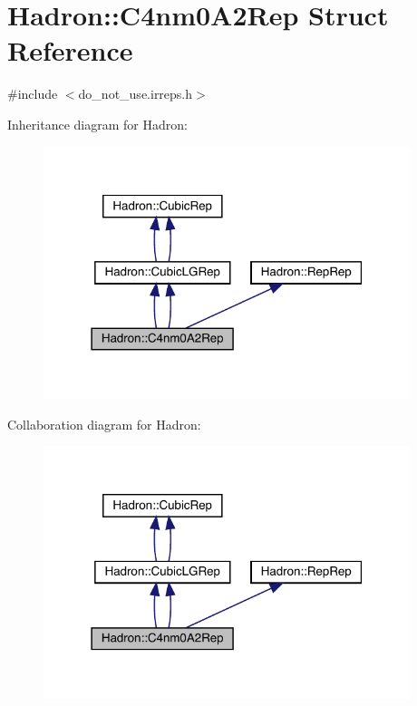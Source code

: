 \hypertarget{structHadron_1_1C4nm0A2Rep}{}\section{Hadron\+:\+:C4nm0\+A2\+Rep Struct Reference}
\label{structHadron_1_1C4nm0A2Rep}


{\ttfamily \#include $<$do\+\_\+not\+\_\+use.\+irreps.\+h$>$}



Inheritance diagram for Hadron\+:\nopagebreak
\begin{figure}[H]
\begin{center}
\leavevmode
\includegraphics[width=303pt]{de/d1f/structHadron_1_1C4nm0A2Rep__inherit__graph}
\end{center}
\end{figure}


Collaboration diagram for Hadron\+:\nopagebreak
\begin{figure}[H]
\begin{center}
\leavevmode
\includegraphics[width=303pt]{d7/dde/structHadron_1_1C4nm0A2Rep__coll__graph}
\end{center}
\end{figure}
